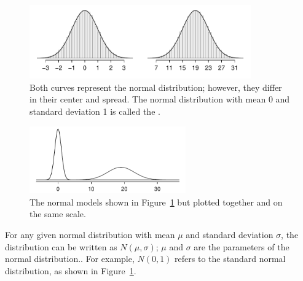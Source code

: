 \begin{figure}[hht]
\centering
\includegraphics[width=0.85\textwidth]{ch_distributions_oi_biostat/figures/twoSampleNormals/twoSampleNormals}
\caption{Both curves represent the normal distribution; however, they differ in their center and spread. The normal distribution with mean 0 and standard deviation 1 is called the .}
\label{twoSampleNormals}
\end{figure}

\begin{figure}[hht]
\centering
\includegraphics[width=0.6\textwidth]{ch_distributions_oi_biostat/figures/twoSampleNormalsStacked/twoSampleNormalsStacked}
\caption{The normal models shown in Figure~\ref{twoSampleNormals} but plotted together and on the same scale.}
\label{twoSampleNormalsStacked}
\end{figure}

For any given normal distribution with mean $\mu$ and standard deviation $\sigma$, the distribution can be written as $N(\mu, \sigma)$; $\mu$ and $\sigma$ are the parameters of the normal distribution.. For example, $N(0, 1)$ refers to the standard normal distribution, as shown in Figure~\ref{twoSampleNormals}. 

